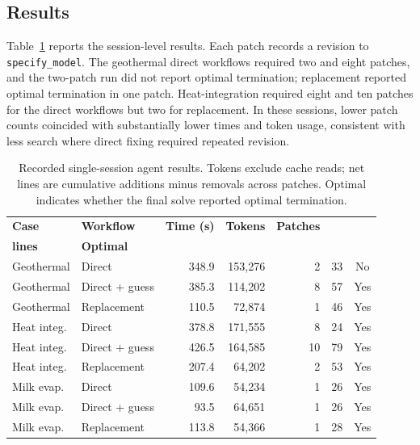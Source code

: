 \documentclass[10pt,letterpaper]{article}
\begin{document}
\subsection{Results}
Table~\ref{tab:results} reports the session-level results. Each patch records a revision to \texttt{specify\_model}. The geothermal direct workflows required two and eight patches, and the two-patch run did not report optimal termination; replacement reported optimal termination in one patch. Heat-integration required eight and ten patches for the direct workflows but two for replacement. In these sessions, lower patch counts coincided with substantially lower times and token usage, consistent with less search where direct fixing required repeated revision.

\begin{table}[!ht]
  \caption{Recorded single-session agent results. Tokens exclude cache reads; net lines are cumulative additions minus removals across patches. Optimal indicates whether the final solve reported optimal termination.}
  \label{tab:results}
  \centering
  \scriptsize
  \renewcommand{\arraystretch}{1.02}
  \setlength{\tabcolsep}{2pt}
  \begin{tabular}{@{}llrrrrc@{}}
    \toprule
    \textbf{Case} & \textbf{Workflow} & \textbf{Time (s)} & \textbf{Tokens} & \textbf{Patches} & \shortstack{\textbf{Net} \\ \textbf{lines}} & \textbf{Optimal} \\
    \midrule
    Geothermal & Direct & 348.9 & 153,276 & 2 & 33 & No \\
    Geothermal & Direct + guess & 385.3 & 114,202 & 8 & 57 & Yes \\
    Geothermal & Replacement & 110.5 & 72,874 & 1 & 46 & Yes \\
    Heat integ. & Direct & 378.8 & 171,555 & 8 & 24 & Yes \\
    Heat integ. & Direct + guess & 426.5 & 164,585 & 10 & 79 & Yes \\
    Heat integ. & Replacement & 207.4 & 64,202 & 2 & 53 & Yes \\
    Milk evap. & Direct & 109.6 & 54,234 & 1 & 26 & Yes \\
    Milk evap. & Direct + guess & 93.5 & 64,651 & 1 & 26 & Yes \\
    Milk evap. & Replacement & 113.8 & 54,366 & 1 & 28 & Yes \\
    \bottomrule
  \end{tabular}
\end{table}
\end{document}
